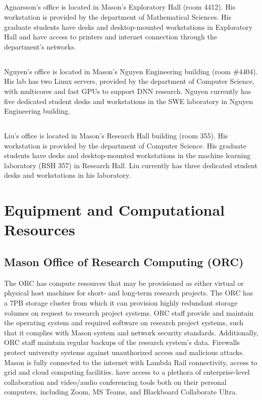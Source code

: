 \documentclass[11pt]{article}
\newcommand{\alert}[1]{{\color{blue}{#1}}}
\begin{document}
\subsection*{\alert{Agnarsson Lab}} Agnarsson's office is located in Mason's Exploratory Hall (room 4412). His workstation is provided by the department of Mathematical Sciences. His graduate students have desks and desktop-mounted workstations in Exploratory Hall and have access to printers and internet connection through the department’s networks.

\subsection*{\alert{Nguyen Lab}} Nguyen's office is located in Mason's Nguyen Engineering building (room \#4404). His lab has two Linux servers, provided by the department of Computer Science, with multicores and fast GPUs to support DNN research. Nguyen currently has five dedicated student desks and workstations in the SWE laboratory in Nguyen Engineering building.

\subsection*{\alert{Liu Lab}} Liu's office is located in Mason's Research Hall building (room 355). His workstation is provided by the department of Computer Science. His graduate students have desks and desktop-mounted workstations in the machine learning laboratory (RSH 357) in Research Hall. Liu currently has three dedicated student desks and workstations in his laboratory.


\section*{Equipment and Computational Resources}

\subsection*{Mason Office of Research Computing (ORC)} The ORC has compute resources that may be provisioned as either virtual or physical host machines for short- and long-term research projects. The ORC has a $7$PB storage cluster from which it can provision highly redundant storage volumes on request to research project systems. ORC staff provide and maintain the operating system and required software on research project systems, such that it complies with Mason system and network security standards. Additionally, ORC staff maintain regular backups of the research system’s data. Firewalls protect university systems against unauthorized access and malicious attacks. Mason is fully connected to the internet with Lambda Rail connectivity, access to grid and cloud computing facilities. have access to a plethora of enterprise-level collaboration and video/audio conferencing tools both on their personal computers, including Zoom, MS Teams, and Blackboard Collaborate Ultra. 	
\end{document}
